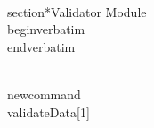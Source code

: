 \\section*{Validator Module}
\\begin{verbatim}
% Validator Module for TeX Data Processing
% This module validates the parsed data against defined rules.
% Rules include:
% 1. Non-empty fields.
% 2. Numeric fields for specific columns.
% 3. Date formats (YYYY-MM-DD).
\\end{verbatim}

\\newcommand{\\validateData}[1]{
}
